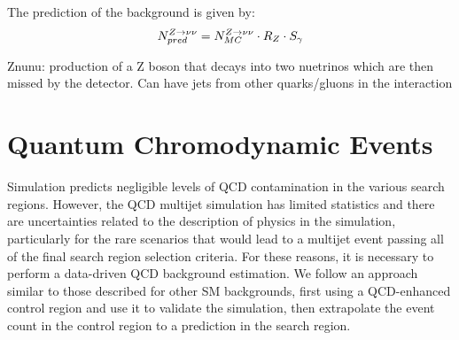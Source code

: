 The prediction of the \Znunu{} background is given by:
\begin{equation}
N_{pred}^{Z\rightarrow\nu\nu}=N_{MC}^{Z\rightarrow\nu\nu} \cdot R_Z \cdot S_\gamma
\end{equation}

Znunu: production of a Z boson that decays into two nuetrinos which are then missed by the detector. Can have jets from other quarks/gluons in the interaction

\section{Quantum Chromodynamic Events}
\label{subsec:QCD}

Simulation predicts negligible levels of QCD contamination in the various search regions. However, the QCD multijet simulation has limited statistics and there are uncertainties related to the description of physics in the simulation, particularly for the rare scenarios that would lead to a multijet event passing all of the final search region selection criteria. For these reasons, it is necessary to perform a data-driven QCD background estimation. We follow an approach similar to those described for other SM backgrounds, first using a QCD-enhanced control region and use it to validate the simulation, then extrapolate the event count in the control region to a prediction in the search region. 

